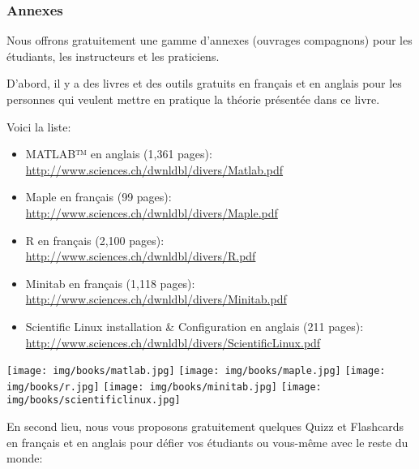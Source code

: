	\pagebreak
	\subsubsection{Annexes}
	Nous offrons gratuitement une gamme d'annexes (ouvrages compagnons) pour les \'etudiants, les instructeurs et les praticiens.
	
	D'abord, il y a des livres et des outils gratuits en français et en anglais pour les personnes qui veulent mettre en pratique la th\'eorie pr\'esent\'ee dans ce livre.
	
	Voici la liste:
	\begin{itemize}
		\item MATLAB™ en anglais (1,361 pages):\\ \href{http://www.sciences.ch/htmlfr/php/cliccount/click.php?id=319}{http://www.sciences.ch/dwnldbl/divers/Matlab.pdf}
		
		\item Maple en français (99 pages):\\ \href{http://www.sciences.ch/dwnldbl/divers/Maple.pdf}{http://www.sciences.ch/dwnldbl/divers/Maple.pdf}
		
		\item \textsf{R} en français (2,100 pages):\\ \href{http://www.sciences.ch/htmlfr/php/cliccount/click.php?id=313}{http://www.sciences.ch/dwnldbl/divers/R.pdf}
		
		\item Minitab en français (1,118 pages):\\ \href{http://www.sciences.ch/htmlfr/php/cliccount/click.php?id=282}{http://www.sciences.ch/dwnldbl/divers/Minitab.pdf}
		
		\item Scientific Linux installation \& Configuration en anglais  (211 pages):\\ \href{http://www.sciences.ch/dwnldbl/divers/ScientificLinux.pdf}{http://www.sciences.ch/dwnldbl/divers/ScientificLinux.pdf}
	\end{itemize}
	\begin{center}
		\texttt{[image: img/books/matlab.jpg]}
		\texttt{[image: img/books/maple.jpg]}
		\texttt{[image: img/books/r.jpg]}
		\texttt{[image: img/books/minitab.jpg]}
		\texttt{[image: img/books/scientificlinux.jpg]} 
	\end{center}	
	En second lieu, nous vous proposons gratuitement quelques Quizz et Flashcards en français et en anglais pour d\'efier vos \'etudiants ou vous-même avec le reste du monde:
